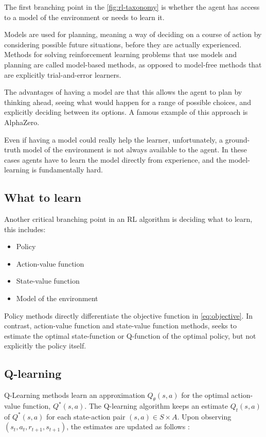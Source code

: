 \documentclass{article}
\begin{document}
The first branching point in the \autoref{fig:rl-taxonomy} is whether the agent has access to a model  of the environment or needs to learn it.

Models are used for planning, meaning a way of deciding on a course of action by considering possible future situations, before they are actually experienced. Methods for solving reinforcement learning problems that use models and planning are called model-based methods, as opposed to model-free methods that are explicitly trial-and-error learners.

The advantages of having a model are that this allows the agent to plan by thinking ahead, seeing what would happen for a range of possible choices, and explicitly deciding between its options. A famous example of this approach is AlphaZero. \cite{silver2017mastering}

Even if having a model could really help the learner, unfortunately, a ground-truth model of the environment is not always available to the agent. In these cases agents have to learn the model directly from experience, and the model-learning is fundamentally hard.

\subsection{What to learn}

Another critical branching point in an RL algorithm is deciding what to learn, this includes:
\begin{itemize}
	\item Policy
	\item Action-value function
	\item State-value function
	\item Model of the environment
\end{itemize}

Policy methods directly differentiate the objective function in \autoref{eq:objective}. In contrast, action-value function and state-value function methods, seeks to estimate the optimal state-function or Q-function of the optimal policy, but not explicitly the policy itself.


\subsection{Q-learning}


Q-Learning methods learn an approximation $Q_{\theta}(s,a)$ for the optimal action-value function, $Q^*(s,a)$. The Q-learning algorithm keeps an estimate $Q_t(s,a)$ of $Q^*(s,a)$ for each state-action pair $(s,a) \in S \times A$. Upon observing $(s_t, a_t, r_{t+1}, s_{t+1})$, the estimates are updated as follows \cite{series/synthesis/2010Szepesvari}:
\end{document}
